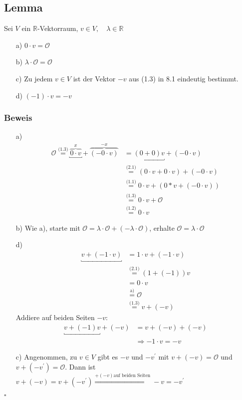 \documentclass[12pt, titlepage]{article}
\newcommand{\R}{\mathds{R}}
\renewcommand{\O}{\mathcal{O}}
\renewcommand{\>}{\rightarrow}
\renewcommand{\*}{\cdot}
\begin{document}
	\subsection{Lemma}
	Sei $V$ ein $\R$-Vektorraum, $v\in V,\quad\lambda\in\R$
	\begin{itemize}
		\item[a)] $0\*v=\O$
		\item[b)] $\lambda\*\O=\O$
		\item[c)] Zu jedem $v\in V$ ist der Vektor $-v$ aus (1.3) in 8.1 eindeutig bestimmt.
		\item[d)] $(-1)\*v=-v$
	\end{itemize}
	\subsubsection*{Beweis}
	\begin{itemize}
		\item[a)] \begin{align*}
			\O\overset{\textrm{(1.3)}}{=}\overbrace{\underbracket{0\*v}_{}}^{x}+\overbrace{(-0\*v)}^{-x}&=\underbracket{(0+0)v}_{}+(-0\*v)\\
			&\overset{\textrm{(2.1)}}{=}(0\*v+0\*v)+(-0\*v)\\
			&\overset{\textrm{(1.1)}}{=}0\*v+(0*v+(-0\*v))\\
			&\overset{\textrm{(1.3)}}{=}0\*v+\O\\
			&\overset{\textrm{(1.2)}}{=}0\*v
		\end{align*}
		\item[b)] Wie a), starte mit $\O=\lambda\*\O+(-\lambda\*\O)$, erhalte $\O=\lambda\*\O$
		\item[d)] \begin{align*}
			\underbracket{v+(-1\*v)}_{}&=1\*v+(-1\*v)\\
			&\overset{\textrm{(2.1)}}{=}(1+(-1))v\\
			&=0\*v\\
			&\overset{\textrm{a)}}{=}\O\\
			&\overset{\textrm{(1.3)}}{=}v+(-v)
		\end{align*}
		Addiere auf beiden Seiten $-v$:
		\begin{align*}
			\underbracket{v+(-1)v}_{}+(-v)&=v+(-v)+(-v)\\
			&\Rightarrow-1\*v=-v		
		\end{align*}
		\item[c)] Angenommen, zu $v\in V$ gibt es $-v$ und $-v^\prime$ mit $v+(-v)=\O$ und $v+(-v^\prime)=\O$. Dann ist $v+(-v)=v+(-v^\prime)\overset{+(-v)\textrm{auf beiden Seiten}}{\Rightarrow}-v=-v^\prime$
	\end{itemize}
	\hfill$\square$
\end{document}
